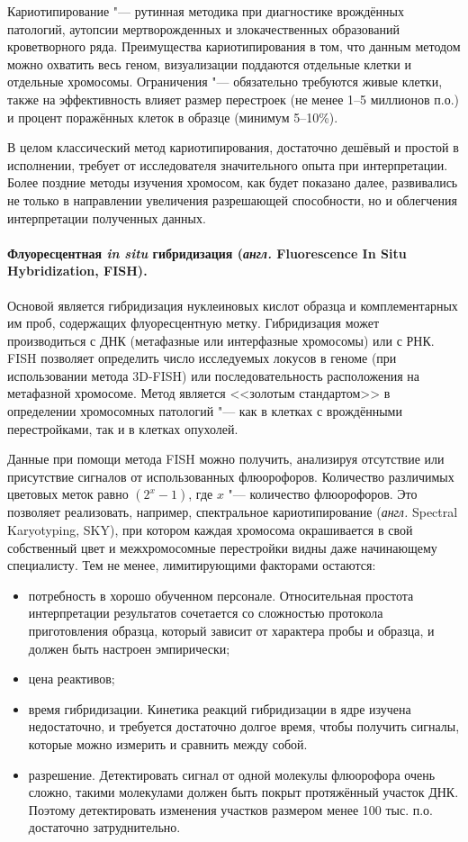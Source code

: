 \documentclass[a4paper,12pt]{article}
\begin{document}
Кариотипирование "--- рутинная методика при диагностике врождённых патологий, аутопсии мертворожденных и злокачественных образований кроветворного ряда.
Преимущества кариотипирования в том, что данным методом можно охватить весь геном, визуализации поддаются отдельные клетки и отдельные хромосомы.
Ограничения "--- обязательно требуются живые клетки, также на эффективность влияет размер перестроек (не менее 1--5 миллионов п.о.) и процент поражённых клеток в образце (минимум 5--10\%)\cite{Sampson_2014}.

В целом классический метод кариотипирования, достаточно дешёвый и простой в исполнении, требует от исследователя значительного опыта при интерпретации.
Более поздние методы изучения хромосом, как будет показано далее, развивались не только в направлении увеличения разрешающей способности, но и облегчения интерпретации полученных данных.

\paragraph{Флуоресцентная \textit{in situ} гибридизация (\textit{англ.} Fluorescence In Situ Hybridization, FISH).}
Основой является гибридизация нуклеиновых кислот образца и комплементарных им проб, содержащих флуоресцентную метку.
Гибридизация может производиться с ДНК (метафазные или интерфазные хромосомы) или с РНК.
FISH позволяет определить число исследуемых локусов в геноме (при использовании метода 3D-FISH) или последовательность расположения на метафазной хромосоме.
Метод является <<золотым стандартом>> в определении хромосомных патологий "--- как в клетках с врождёнными перестройками, так и в клетках опухолей.

Данные при помощи метода FISH можно получить, анализируя отсутствие или присутствие сигналов от использованных флюорофоров.
Количество различимых цветовых меток равно $(2^x - 1)$, где  $x$ "--- количество флюорофоров.
Это позволяет реализовать, например, спектральное кариотипирование (\textit{англ.} Spectral Karyotyping, SKY), при котором каждая хромосома окрашивается в свой собственный цвет и межхромосомные перестройки видны даже начинающему специалисту\cite{Guo_2014}.
Тем не менее, лимитирующими факторами остаются:

\begin{itemize}
\item потребность в хорошо обученном персонале.
Относительная простота интерпретации результатов сочетается со сложностью протокола приготовления образца, который зависит от характера пробы и образца, и должен быть настроен эмпирически;
\item цена реактивов;
\item время гибридизации.
Кинетика реакций гибридизации в ядре изучена недостаточно, и требуется достаточно долгое время, чтобы получить сигналы, которые можно измерить и сравнить между собой.
\item разрешение.
Детектировать сигнал от одной молекулы флюорофора очень сложно, такими молекулами должен быть покрыт протяжённый участок ДНК.
Поэтому детектировать изменения участков размером менее 100 тыс. п.о. достаточно затруднительно.
\end{itemize}
\end{document}
